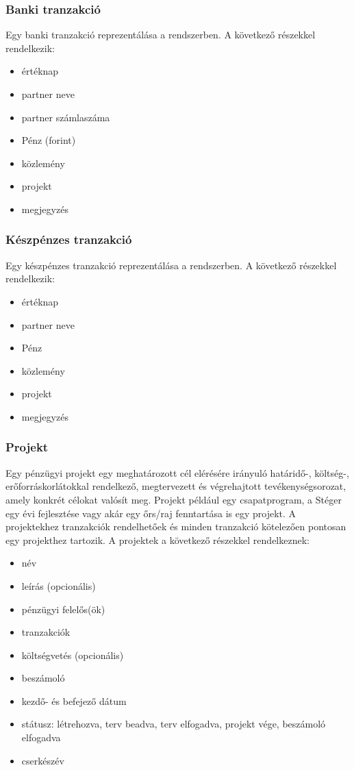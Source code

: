 \documentclass[a4paper,12pt]{article}
\begin{document}
\subsubsection{Banki tranzakció}
Egy banki tranzakció reprezentálása a rendszerben. A következő részekkel rendelkezik:
\begin{itemize}
  \item értéknap
  \item partner neve
  \item partner számlaszáma
  \item Pénz (forint)
  \item közlemény
  \item projekt
  \item megjegyzés
\end{itemize}
\subsubsection{Készpénzes tranzakció}
Egy készpénzes tranzakció reprezentálása a rendszerben. A következő részekkel rendelkezik:
\begin{itemize}
  \item értéknap
  \item partner neve
  \item Pénz
  \item közlemény
  \item projekt
  \item megjegyzés
\end{itemize}
\subsubsection{Projekt}
Egy pénzügyi projekt egy meghatározott cél elérésére irányuló határidő-, költség-, erőforráskorlátokkal rendelkező, megtervezett és végrehajtott tevékenységsorozat, amely konkrét célokat valósít meg. Projekt például egy csapatprogram, a Stéger egy évi fejlesztése vagy akár egy őrs/raj fenntartása is egy projekt. A projektekhez tranzakciók rendelhetőek és minden tranzakció kötelezően pontosan egy projekthez tartozik. A projektek a következő részekkel rendelkeznek:
\begin{itemize}
  \item név
  \item leírás (opcionális)
  \item pénzügyi felelős(ök)
  \item tranzakciók
  \item költségvetés (opcionális)
  \item beszámoló
  \item kezdő- és befejező dátum
  \item státusz: létrehozva, terv beadva, terv elfogadva, projekt vége, beszámoló elfogadva
  \item cserkészév
\end{itemize}
\end{document}

